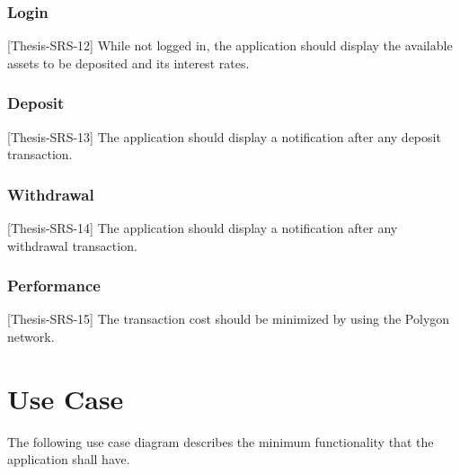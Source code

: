 \documentclass[11pt,a4paper]{report}
\begin{document}
\subsubsection{Login}
[Thesis-SRS-12] While not logged in, the application should display the available assets to be deposited and its interest rates. 
\subsubsection{Deposit}
[Thesis-SRS-13] The application should display a notification after any deposit transaction.
\subsubsection{Withdrawal}
[Thesis-SRS-14] The application should display a notification after any withdrawal transaction.
\subsubsection{Performance}
[Thesis-SRS-15] The transaction cost should be minimized by using the Polygon network.

\newpage
\section{Use Case}
The following use case diagram describes the minimum functionality that the application shall have.
\end{document}
